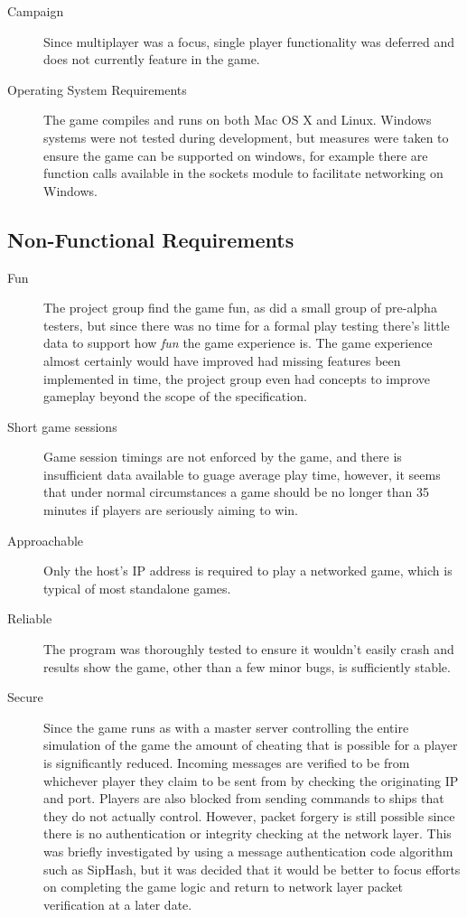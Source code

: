 \begin{description}
  \item[Campaign] Since multiplayer was a focus, single player functionality was deferred and does not currently feature in the game.

  \item[Operating System Requirements] The game compiles and runs on both Mac OS X and Linux. Windows systems were not tested during development, but measures were taken to ensure the game can be supported on windows, for example there are function calls available in the sockets module to facilitate networking on Windows.

\end{description}

\subsection{Non-Functional Requirements}
\begin{description}
  \item[Fun] The project group find the game fun, as did a small group of pre-alpha testers, but since there was no time for a formal play testing there's little data to support how \emph{fun} the game experience is. The game experience almost certainly would have improved had missing features been implemented in time, the project group even had concepts to improve gameplay beyond the scope of the specification.
    
  \item[Short game sessions] Game session timings are not enforced by the game, and there is insufficient data available to guage average play time, however, it seems that under normal circumstances a game should be no longer than 35 minutes if players are seriously aiming to win.

  \item[Approachable] Only the host's IP address is required to play a networked game, which is typical of most standalone games.  

  \item[Reliable] The program was thoroughly tested to ensure it wouldn't easily crash and results show the game, other than a few minor bugs, is sufficiently stable.

  \item[Secure] Since the game runs as with a master server controlling the entire simulation of the game the amount of cheating that is possible for a player is significantly reduced. Incoming messages are verified to be from whichever player they claim to be sent from by checking the originating IP and port. Players are also blocked from sending commands to ships that they do not actually control. However, packet forgery is still possible since there is no authentication or integrity checking at the network layer. This was briefly investigated by using a message authentication code algorithm such as SipHash,\cite{aumasson2012siphash} but it was decided that it would be better to focus efforts on completing the game logic and return to network layer packet verification at a later date.

\end{description}
